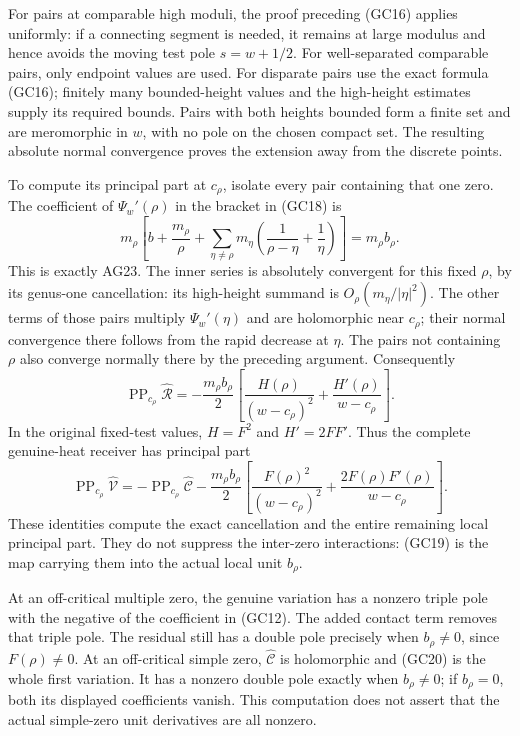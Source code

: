 \documentclass[
  10pt,
  a4paper,
]{article}
\begin{document}
For pairs at comparable high moduli, the proof preceding (GC16) applies
uniformly: if a connecting segment is needed, it remains at large
modulus and hence avoids the moving test pole \(s=w+1/2\). For
well-separated comparable pairs, only endpoint values are used. For
disparate pairs use the exact formula (GC16); finitely many
bounded-height values and the high-height estimates supply its required
bounds. Pairs with both heights bounded form a finite set and are
meromorphic in \(w\), with no pole on the chosen compact set. The
resulting absolute normal convergence proves the extension away from the
discrete points.

To compute its principal part at \(c_\rho\), isolate every pair
containing that one zero. The coefficient of \(\Psi_w'(\rho)\) in the
bracket in (GC18) is \[
m_\rho\left[
b+\frac{m_\rho}{\rho}
+\sum_{\eta\ne\rho}m_\eta
\left(\frac1{\rho-\eta}+\frac1\eta\right)
\right]=m_\rho b_\rho.
\tag{GC19}
\] This is exactly AG23. The inner series is absolutely convergent for
this fixed \(\rho\), by its genus-one cancellation: its high-height
summand is \(O_\rho(m_\eta/|\eta|^2)\). The other terms of those pairs
multiply \(\Psi_w'(\eta)\) and are holomorphic near \(c_\rho\); their
normal convergence there follows from the rapid decrease at \(\eta\).
The pairs not containing \(\rho\) also converge normally there by the
preceding argument. Consequently \[
\boxed{
\operatorname{PP}_{c_\rho}\widehat{\mathcal R}
=-\frac{m_\rho b_\rho}{2}
\left[
\frac{H(\rho)}{(w-c_\rho)^2}
+\frac{H'(\rho)}{w-c_\rho}
\right].}
\tag{GC20}
\] In the original fixed-test values, \(H=F^2\) and \(H'=2FF'\). Thus
the complete genuine-heat receiver has principal part \[
\boxed{
\operatorname{PP}_{c_\rho}\widehat{\mathcal V}
=-\operatorname{PP}_{c_\rho}\widehat{\mathcal C}
-\frac{m_\rho b_\rho}{2}
\left[
\frac{F(\rho)^2}{(w-c_\rho)^2}
+\frac{2F(\rho)F'(\rho)}{w-c_\rho}
\right].}
\tag{GC21}
\] These identities compute the exact cancellation and the entire
remaining local principal part. They do not suppress the inter-zero
interactions: (GC19) is the map carrying them into the actual local unit
\(b_\rho\).

At an off-critical multiple zero, the genuine variation has a nonzero
triple pole with the negative of the coefficient in (GC12). The added
contact term removes that triple pole. The residual still has a double
pole precisely when \(b_\rho\ne0\), since \(F(\rho)\ne0\). At an
off-critical simple zero, \(\widehat{\mathcal C}\) is holomorphic and
(GC20) is the whole first variation. It has a nonzero double pole
exactly when \(b_\rho\ne0\); if \(b_\rho=0\), both its displayed
coefficients vanish. This computation does not assert that the actual
simple-zero unit derivatives are all nonzero.
\end{document}
